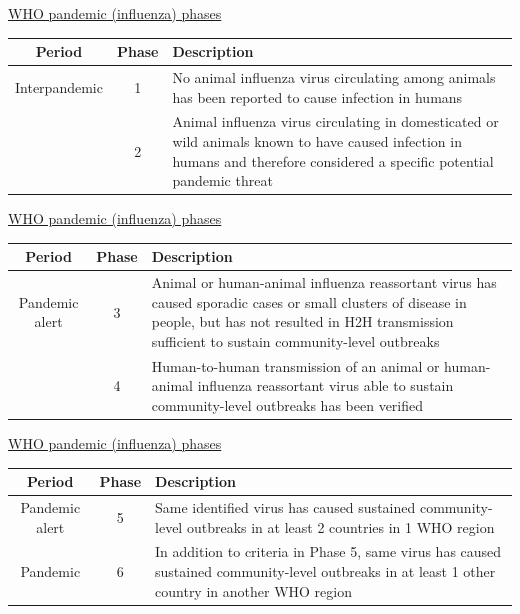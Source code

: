 \documentclass[aspectratio=169]{beamer}\usepackage[]{graphicx}\usepackage[]{xcolor}
\begin{document}
\begin{frame}{\href{https://www.ncbi.nlm.nih.gov/books/NBK143061/}{WHO pandemic (influenza) phases}}


\begin{tabular}{ccp{6cm}}
Period & Phase & Description \\
\hline
\rowcolor{lgreen} \color{black}Interpandemic & \color{black}1 & \color{black} No animal influenza virus circulating among animals has been reported to cause infection in humans \\
\rowcolor{lgreen} & \color{black}2 & \color{black}Animal influenza virus circulating in domesticated or wild animals known to have caused infection in humans and therefore considered a specific potential pandemic threat
\end{tabular}
\end{frame}

\begin{frame}{\href{https://www.ncbi.nlm.nih.gov/books/NBK143061/}{WHO pandemic (influenza) phases}}
\begin{tabular}{ccp{6cm}}
Period & Phase & Description \\
\hline 
\rowcolor{yellow} \color{black}Pandemic alert & \color{black}3 & \color{black}Animal or human-animal influenza reassortant virus has caused sporadic cases or small clusters of disease in people, but has not resulted in H2H transmission sufficient to sustain community-level outbreaks \\
\rowcolor{yellow} & \color{black}4 & \color{black}Human-to-human transmission of an animal or human-animal influenza reassortant virus able to sustain community-level outbreaks has been verified 
\end{tabular}
\end{frame}

\begin{frame}{\href{https://www.ncbi.nlm.nih.gov/books/NBK143061/}{WHO pandemic (influenza) phases}}
\begin{tabular}{ccp{6cm}}
    Period & Phase & Description \\
    \hline 
\rowcolor{orange} \color{black}Pandemic alert & \color{black} 5 & \color{black} Same identified virus has caused sustained community-level outbreaks in at least 2 countries in 1 WHO region \\
\rowcolor{lred} \color{black}Pandemic & \color{black}6 & \color{black}In addition to criteria in Phase 5, same virus has caused sustained community-level outbreaks in at least 1 other country in another WHO region
\end{tabular}
\end{frame}
\end{document}
